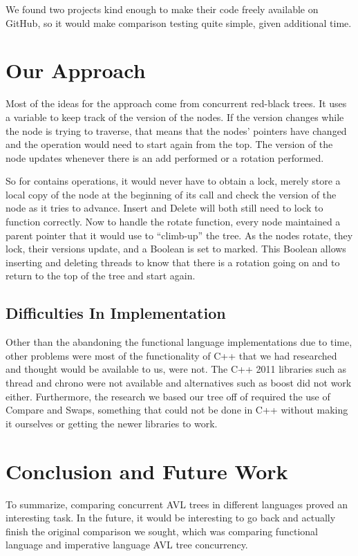 \documentclass[finalreport,12pt]{elsarticle}
\begin{document}
We found two projects kind enough to make their code freely available on GitHub, so it would make comparison testing quite simple, given additional time. 



\section{Our Approach}
\label{S:4}

Most of the ideas for the approach come from concurrent red-black trees\cite{Kim}. It uses a variable to keep track of the version of the nodes. If the version changes while the node is trying to traverse, that means that the nodes' pointers have changed and the operation would need to start again from the top. The version of the node updates whenever there is an add performed or a rotation performed. 

So for contains operations, it would never have to obtain a lock, merely store a local copy of the node at the beginning of its call and check the version of the node as it tries to advance. Insert and Delete will both still need to lock to function correctly. Now to handle the rotate function, every node maintained a parent pointer that it would use to “climb-up” the tree. As the nodes rotate, they lock, their versions update, and a Boolean is set to marked. This Boolean allows inserting and deleting threads to know that there is a rotation going on and to return to the top of the tree and start again. 

\subsection{Difficulties In Implementation}
Other than the abandoning the functional language implementations due to time, other problems were most of the functionality of C++ that we had researched and thought would be available to us, were not. The C++ 2011 libraries such as thread and chrono were not available and alternatives such as boost did not work either. Furthermore, the research we based our tree off of required the use of Compare and Swaps, something that could not be done in C++ without making it ourselves or getting the newer libraries to work.

\section{Conclusion and Future Work}
\label{S:5}

To summarize, comparing concurrent AVL trees in different languages proved an interesting task. In the future, it would be interesting to go back and actually finish the original comparison we sought, which was comparing functional language and imperative language AVL tree concurrency. 
\end{document}
